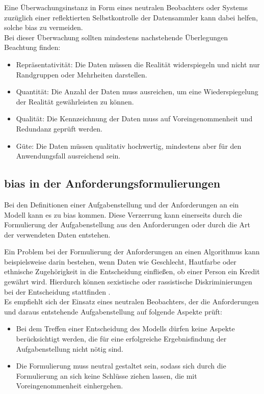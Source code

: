 \documentclass[hidelinks,12pt]{report}
\begin{document}
Eine Überwachungsinstanz in Form eines neutralen Beobachters oder Systems zuzüglich einer reflektierten Selbstkontrolle der Datensammler kann dabei helfen, solche \Gls{bias}  zu vermeiden.\\

Bei dieser Überwachung sollten mindestens nachstehende Überlegungen Beachtung finden: \\%
\begin{itemize}

    \item Repräsentativität: Die Daten müssen die Realität widerspiegeln und nicht nur Randgruppen oder Mehrheiten darstellen.
    \item Quantität: Die Anzahl der Daten muss ausreichen,  um eine Wiederspiegelung der Realität gewährleisten zu können.
    \item Qualität: Die Kennzeichnung der Daten muss auf Voreingenommenheit und Redundanz geprüft werden.
    \item Güte: Die Daten müssen qualitativ hochwertig, mindestens aber für den Anwendungsfall ausreichend sein.

\end{itemize}

\subsection{\Gls{bias}  in der Anforderungsformulierungen}
Bei den Definitionen einer Aufgabenstellung und der Anforderungen an ein Modell kann es zu \Gls{bias}  kommen. Diese Verzerrung kann einerseits durch die Formulierung der Aufgabenstellung aus den Anforderungen oder durch die Art der verwendeten Daten entstehen.  \cite[S. 51f.]{Srinivasan} 

Ein Problem bei der Formulierung der Anforderungen an einen Algorithmus kann beispielsweise darin bestehen, wenn Daten wie Geschlecht, Hautfarbe oder ethnische Zugehörigkeit in die Entscheidung einfließen, ob einer Person ein Kredit gewährt wird. Hierdurch können sexistische oder rassistische Diskriminierungen bei der Entscheidung stattfinden \cite[S. 51f.]{Srinivasan}.\\

Es empfiehlt sich der Einsatz eines neutralen Beobachters, der die Anforderungen und daraus entstehende Aufgabenstellung auf folgende Aspekte prüft: \\%
\begin{itemize}
    \item Bei dem Treffen einer Entscheidung des Modells dürfen keine Aspekte berücksichtigt werden, die für eine erfolgreiche Ergebnisfindung der Aufgabenstellung nicht nötig sind.
    \item Die Formulierung muss neutral gestaltet sein, sodass sich durch die Formulierung an sich keine Schlüsse ziehen lassen, die mit Voreingenommenheit einhergehen.
\end{itemize}
\end{document}
